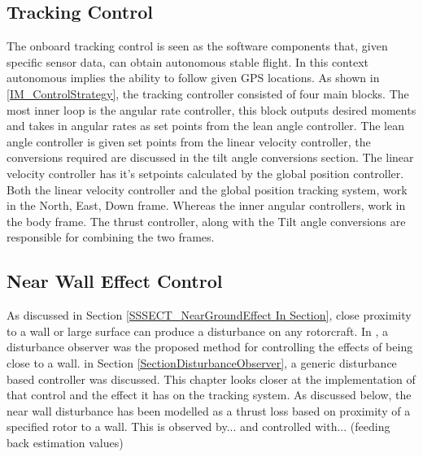 		\subsection{Tracking Control}
		The onboard tracking control is seen as the software components that, given specific sensor data, can obtain autonomous stable flight. In this context autonomous implies the ability to follow given GPS locations. As shown in \ref{IM_ControlStrategy}, the tracking controller consisted of four main blocks. The  most inner loop is the angular rate controller, this block outputs desired moments and takes in angular rates as set points from the lean angle controller. The lean angle controller is given set points from the linear velocity controller, the conversions required are discussed in the tilt angle conversions section. The linear velocity controller has it's setpoints calculated by the global position controller. 
		Both the linear velocity controller and the global position tracking system, work in the North, East, Down frame. Whereas the inner angular controllers, work in the body frame. The thrust controller, along with the Tilt angle conversions are responsible for combining the two frames.
		
		\subsection{Near Wall Effect Control}
		As discussed in Section \ref{SSSECT_NearGroundEffect In Section}, close proximity to a wall or large surface can produce a disturbance on any rotorcraft. In \cite{NearWall}, a disturbance observer was the proposed method for controlling the effects of being close to a wall. in Section \ref{SectionDisturbanceObserver}, a generic disturbance based controller was discussed. This chapter looks closer at the implementation of that control and the effect it has on the tracking system.
		As discussed below, the near wall disturbance has been modelled as a thrust loss based on proximity of a specified rotor to a wall. This is observed by... and controlled with... (feeding back estimation values)
		
